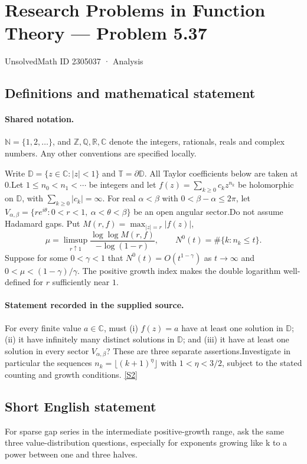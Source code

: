 \documentclass[11pt]{article}
\newcommand{\sref}[2]{\hyperlink{source:#1:#2}{[S#2]}}
\begin{document}
\setcounter{section}{2305036}
\section{Research Problems in Function Theory — Problem 5.37}\label{2305037}
{\small\sffamily UnsolvedMath ID 2305037 · Analysis}
\subsection{Definitions and mathematical statement}

\paragraph{Shared notation.}$\mathbb N=\{1,2,\ldots\}$, and $\mathbb Z,\mathbb Q,\mathbb R,\mathbb C$ denote the integers, rationals, reals and complex numbers. Any other conventions are specified locally.


Write $\mathbb D=\{z\in\mathbb C:|z|<1\}$ and $\mathbb T=\partial\mathbb D$. All Taylor coefficients below are taken at $0$.Let $1\le n_0<n_1<\cdots$ be integers and let $f(z)=\sum_{k\ge0}c_kz^{n_k}$ be holomorphic on $\mathbb D$, with $\sum_{k\ge0}|c_k|=\infty$. For real $\alpha<\beta$ with $0<\beta-\alpha\le2\pi$, let $V_{\alpha,\beta}=\{re^{i\theta}:0<r<1,\ \alpha<\theta<\beta\}$ be an open angular sector.Do not assume Hadamard gaps. Put $M(r,f)=\max_{|z|=r}|f(z)|$,
\[\mu=\limsup_{r\uparrow1}\frac{\log\log M(r,f)}{-\log(1-r)},\qquad N^0(t)=\#\{k:n_k\le t\}.
\]
Suppose for some $0<\gamma<1$ that $N^0(t)=O(t^{1-\gamma})$ as $t\to\infty$ and $0<\mu<(1-\gamma)/\gamma$. The positive growth index makes the double logarithm well-defined for $r$ sufficiently near $1$.
\paragraph{Statement recorded in the supplied source.}
For every finite value $a\in\mathbb C$, must (i) $f(z)=a$ have at least one solution in $\mathbb D$; (ii) it have infinitely many distinct solutions in $\mathbb D$; and (iii) it have at least one solution in every sector $V_{\alpha,\beta}$? These are three separate assertions.Investigate in particular the sequences $n_k=\lfloor(k+1)^\eta\rfloor$ with $1<\eta<3/2$, subject to the stated counting and growth conditions. \sref{2305037}{2}
\subsection{Short English statement}
For sparse gap series in the intermediate positive-growth range, ask the same three value-distribution questions, especially for exponents growing like k to a power between one and three halves.
\end{document}
